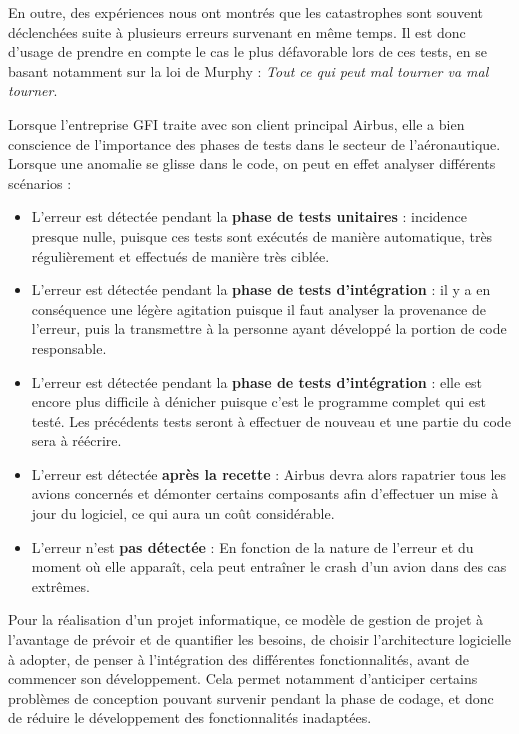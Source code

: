 En outre, des expériences nous ont montrés que les catastrophes sont souvent déclenchées suite à plusieurs erreurs survenant en même temps. Il est donc d'usage de prendre en compte le cas le plus défavorable lors de ces tests, en se basant notamment sur la loi de Murphy : \textit{Tout ce qui peut mal tourner va mal tourner}.

\begin{app} \label{rxp_tests}
Lorsque l'entreprise GFI traite avec son client principal Airbus, elle a bien conscience de l'importance des phases de tests dans le secteur de l'aéronautique. Lorsque une anomalie se glisse dans le code, on peut en effet analyser différents scénarios :
\begin{itemize}
\item L'erreur est détectée pendant la \textbf{phase de tests unitaires} : incidence presque nulle, puisque ces tests sont exécutés de manière automatique, très régulièrement et effectués de manière très ciblée.
\item L'erreur est détectée pendant la \textbf{phase de tests d'intégration} : il y a en conséquence une légère agitation puisque il faut analyser la provenance de l'erreur, puis la transmettre à la personne ayant développé la portion de code responsable.
\item L'erreur est détectée pendant la \textbf{phase de tests d'intégration} : elle est encore plus difficile à dénicher puisque c'est le programme complet qui est testé. Les précédents tests seront à effectuer de nouveau et une partie du code sera à réécrire.
\item L'erreur est détectée \textbf{après la recette} : Airbus devra alors rapatrier tous les avions concernés et démonter certains composants afin d'effectuer un mise à jour du logiciel, ce qui aura un coût considérable.
\item L'erreur n'est \textbf{pas détectée} : En fonction de la nature de l'erreur et du moment où elle apparaît, cela peut entraîner le crash d'un avion dans des cas extrêmes.
\end{itemize}
\end{app}

Pour la réalisation d'un projet informatique, ce modèle de gestion de projet à l'avantage de prévoir et de quantifier les besoins, de choisir l'architecture logicielle à adopter, de penser à l'intégration des différentes fonctionnalités, avant de commencer son développement. Cela permet notamment d'anticiper certains problèmes de conception pouvant survenir pendant la phase de codage, et donc de réduire le développement des fonctionnalités inadaptées.


